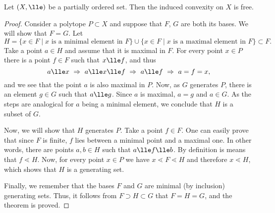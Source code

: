 \documentclass[12pt, a4paper]{article}
\newcommand{\btw}{\lessdot}
\begin{document}
\begin{theorem}\label{th-ord-free}
    Let \((X, \lle)\) be a partially ordered set. Then the induced convexity on \(X\) is free.
\end{theorem}
\begin{proof}
    Consider a polytope \(P \subset X\) and suppose that \(F\), \(G\) are both its bases. We will show that \(F = G\). Let \[H = \{x \in F \mid x \mbox{ is a minimal element in } F\} \cup \{x \in F \mid x \mbox{ is a maximal element in } F\} \subset F.\] Take a point \(a \in H\) and assume that it is maximal in \(F\). For every point \(x \in P\) there is a point \(f \in F\) such that \(x \lle f\), and thus \[a \lle x \ \Rightarrow \ a \lle x \lle f \ \Rightarrow \ a \lle f \ \Rightarrow \ a = f = x,\]  and we see that the point \(a\) is also maximal in \(P\). Now, as \(G\) generates \(P\), there is an element \(g \in G\) such that \(a \lle g\). Since \(a\) is maximal, \(a = g\) and \(a \in G\). As the steps are analogical for \(a\) being a minimal element, we conclude that \(H\) is a subset of \(G\).

    Now, we will show that \(H\) generates \(P\). Take a point \(f \in F\). One can easily prove that since \(F\) is finite, \(f\) lies between a minimal point and a maximal one. In other words, there are points \(a, b \in H\) such that \(a \lle f \lle b\). By definition is means that \(f \btw H\). Now, for every point \(x \in P\) we have \(x \btw F \btw H\) and therefore \(x \btw H\), which shows that \(H\) is a generating set.

    Finally, we remember that the bases \(F\) and \(G\) are minimal (by inclusion) generating sets. Thus, it follows from \(F \supset H \subset G\) that \(F = H = G\), and the theorem is proved.
\end{proof}
\end{document}

